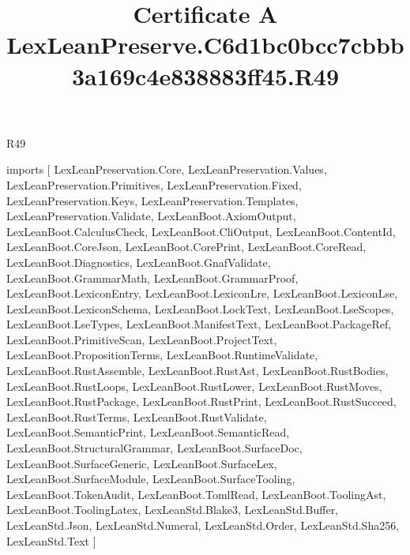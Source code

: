 \begin{lexlean}{R49}
\title{Certificate A LexLeanPreserve.C6d1bc0bcc7cbbb3a169c4e838883ff45.R49}
\begin{coremodule}
imports [
  LexLeanPreservation.Core,
  LexLeanPreservation.Values,
  LexLeanPreservation.Primitives,
  LexLeanPreservation.Fixed,
  LexLeanPreservation.Keys,
  LexLeanPreservation.Templates,
  LexLeanPreservation.Validate,
  LexLeanBoot.AxiomOutput,
  LexLeanBoot.CalculusCheck,
  LexLeanBoot.CliOutput,
  LexLeanBoot.ContentId,
  LexLeanBoot.CoreJson,
  LexLeanBoot.CorePrint,
  LexLeanBoot.CoreRead,
  LexLeanBoot.Diagnostics,
  LexLeanBoot.GnafValidate,
  LexLeanBoot.GrammarMath,
  LexLeanBoot.GrammarProof,
  LexLeanBoot.LexiconEntry,
  LexLeanBoot.LexiconLre,
  LexLeanBoot.LexiconLse,
  LexLeanBoot.LexiconSchema,
  LexLeanBoot.LockText,
  LexLeanBoot.LseScopes,
  LexLeanBoot.LseTypes,
  LexLeanBoot.ManifestText,
  LexLeanBoot.PackageRef,
  LexLeanBoot.PrimitiveScan,
  LexLeanBoot.ProjectText,
  LexLeanBoot.PropositionTerms,
  LexLeanBoot.RuntimeValidate,
  LexLeanBoot.RustAssemble,
  LexLeanBoot.RustAst,
  LexLeanBoot.RustBodies,
  LexLeanBoot.RustLoops,
  LexLeanBoot.RustLower,
  LexLeanBoot.RustMoves,
  LexLeanBoot.RustPackage,
  LexLeanBoot.RustPrint,
  LexLeanBoot.RustSucceed,
  LexLeanBoot.RustTerms,
  LexLeanBoot.RustValidate,
  LexLeanBoot.SemanticPrint,
  LexLeanBoot.SemanticRead,
  LexLeanBoot.StructuralGrammar,
  LexLeanBoot.SurfaceDoc,
  LexLeanBoot.SurfaceGeneric,
  LexLeanBoot.SurfaceLex,
  LexLeanBoot.SurfaceModule,
  LexLeanBoot.SurfaceTooling,
  LexLeanBoot.TokenAudit,
  LexLeanBoot.TomlRead,
  LexLeanBoot.ToolingAst,
  LexLeanBoot.ToolingLatex,
  LexLeanStd.Blake3,
  LexLeanStd.Buffer,
  LexLeanStd.Json,
  LexLeanStd.Numeral,
  LexLeanStd.Order,
  LexLeanStd.Sha256,
  LexLeanStd.Text
]


\end{coremodule}
\end{lexlean}
